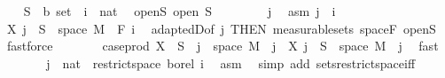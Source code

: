 \begin{isabellebody}
\ \ \isamarkupfalse%
\ S\ {\isacharcolon}{\kern0pt}{\isacharcolon}{\kern0pt}\ {\isachardoublequoteopen}{\isacharprime}{\kern0pt}b\ set{\isachardoublequoteclose}\ \ i\ {\isacharcolon}{\kern0pt}{\isacharcolon}{\kern0pt}\ nat\ \isamarkupfalse%
\ open{\isacharunderscore}{\kern0pt}S{\isacharcolon}{\kern0pt}\ {\isachardoublequoteopen}open\ S{\isachardoublequoteclose}\isanewline
\ \ \isacommand{{\isacharbraceleft}{\kern0pt}}\isamarkupfalse%
\isanewline
\ \ \ \ \isamarkupfalse%
\ j\ \isamarkupfalse%
\ asm{\isacharcolon}{\kern0pt}\ {\isachardoublequoteopen}j\ {\isasymle}\ i{\isachardoublequoteclose}\isanewline
\ \ \ \ \isamarkupfalse%
\ {\isachardoublequoteopen}X\ j\ {\isacharminus}{\kern0pt}{\isacharbackquote}{\kern0pt}\ S\ {\isasyminter}\ space\ M\ {\isasymin}\ F\ i{\isachardoublequoteclose}\ \isamarkupfalse%
\ adaptedD{\isacharbrackleft}{\kern0pt}of\ j{\isacharcomma}{\kern0pt}\ THEN\ measurable{\isacharunderscore}{\kern0pt}sets{\isacharbrackright}{\kern0pt}\ space{\isacharunderscore}{\kern0pt}F\ open{\isacharunderscore}{\kern0pt}S\ \isamarkupfalse%
\ fastforce\isanewline
\ \ \ \ \isamarkupfalse%
\ \isamarkupfalse%
\ {\isachardoublequoteopen}case{\isacharunderscore}{\kern0pt}prod\ X\ {\isacharminus}{\kern0pt}{\isacharbackquote}{\kern0pt}\ S\ {\isasyminter}\ {\isacharbraceleft}{\kern0pt}j{\isacharbraceright}{\kern0pt}\ {\isasymtimes}\ space\ M\ {\isacharequal}{\kern0pt}\ {\isacharbraceleft}{\kern0pt}j{\isacharbraceright}{\kern0pt}\ {\isasymtimes}\ {\isacharparenleft}{\kern0pt}X\ j\ {\isacharminus}{\kern0pt}{\isacharbackquote}{\kern0pt}\ S\ {\isasyminter}\ space\ M{\isacharparenright}{\kern0pt}{\isachardoublequoteclose}\ \ j\ \isamarkupfalse%
\ fast\isanewline
\ \ \ \ \isamarkupfalse%
\ \isamarkupfalse%
\ {\isachardoublequoteopen}{\isacharbraceleft}{\kern0pt}j\ {\isacharcolon}{\kern0pt}{\isacharcolon}{\kern0pt}\ nat{\isacharbraceright}{\kern0pt}\ {\isasymin}\ restrict{\isacharunderscore}{\kern0pt}space\ borel\ {\isacharbraceleft}{\kern0pt}{}{\isachardot}{\kern0pt}{\isachardot}{\kern0pt}i{\isacharbraceright}{\kern0pt}{\isachardoublequoteclose}\ \isamarkupfalse%
\ asm\ \isamarkupfalse%
\ {\isacharparenleft}{\kern0pt}simp\ add{\isacharcolon}{\kern0pt}\ sets{\isacharunderscore}{\kern0pt}restrict{\isacharunderscore}{\kern0pt}space{\isacharunderscore}{\kern0pt}iff{\isacharparenright}{\kern0pt}\isanewline

\end{isabellebody}
